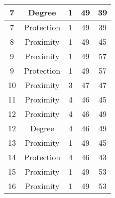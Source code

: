 \documentclass[results.tex]{subfiles}
\begin{document}
\begin{center}
\begin{tabular}{| c || c | c | c | c |}
            \hline
            7                       & Degree                       & 1                      & 49                      & 39                   \\
            \hline
            7                       & Protection                   & 1                      & 49                      & 39                   \\
            \hline
            8                       & Proximity                    & 1                      & 49                      & 45                   \\
            \hline
            9                       & Proximity                    & 1                      & 49                      & 57                   \\
            \hline
            9                       & Protection                   & 1                      & 49                      & 57                   \\
            \hline
            10                      & Proximity                    & 3                      & 47                      & 47                   \\
            \hline
            11                      & Proximity                    & 4                      & 46                      & 45                   \\
            \hline
            12                      & Proximity                    & 4                      & 46                      & 49                   \\
            \hline
            12                      & Degree                       & 4                      & 46                      & 49                   \\
            \hline
            13                      & Proximity                    & 1                      & 49                      & 45                   \\
            \hline
            14                      & Protection                   & 4                      & 46                      & 43                   \\
            \hline
            15                      & Proximity                    & 1                      & 49                      & 53                   \\
            \hline
            16                      & Proximity                    & 1                      & 49                      & 53                   \\

\end{tabular}
\end{center}
\end{document}
